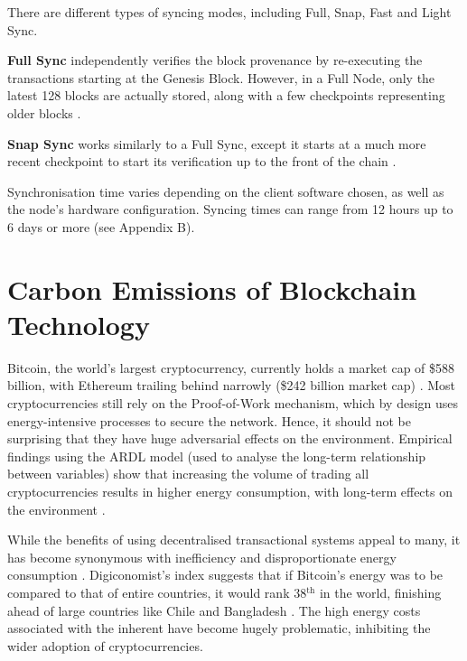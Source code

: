 There are different types of syncing modes, including Full, Snap, Fast and Light Sync.

\textbf{Full Sync }independently verifies the block provenance by re-executing the transactions starting at the Genesis Block. However, in a Full Node, only the latest 128 blocks are actually stored, along with a few checkpoints representing older blocks \cite{EthereumEthereum.org}. 

\textbf{Snap Sync } works similarly to a Full Sync, except it starts at a much more recent checkpoint to start its verification up to the front of the chain \cite{2022DeveloperGo-ethereum}.

Synchronisation time varies depending on the client software chosen, as well as the node's hardware configuration. Syncing times can range from 12 hours up to 6 days or more (see Appendix B).



\section{Carbon Emissions of Blockchain Technology }

Bitcoin, the world's largest cryptocurrency, currently holds a market cap of \$588 billion, with Ethereum trailing behind narrowly (\$242 billion market cap) \cite{BitcoinCoinMarketCap}. Most cryptocurrencies still rely on the Proof-of-Work mechanism, which by design uses energy-intensive processes to secure the network. Hence, it should not be surprising that they have huge adversarial effects on the environment. Empirical findings using the ARDL model (used to analyse the long-term relationship between variables) show that increasing the volume of trading all cryptocurrencies results in higher energy consumption, with long-term effects on the environment \cite{Schinckus2020Crypto-currenciesConsumption}. 

While the benefits of using decentralised transactional systems appeal to many, it has become synonymous with inefficiency and disproportionate energy consumption \cite{DeVriesBitcoinsProblem}. Digiconomist's index suggests that if Bitcoin's energy was to be compared to that of entire countries, it would rank 38$\mathrm{^{th}}$ in the world, finishing ahead of large countries like Chile and Bangladesh \cite{BitcoinDigiconomist}. The high energy costs associated with the inherent have become hugely problematic, inhibiting the wider adoption of cryptocurrencies. 

